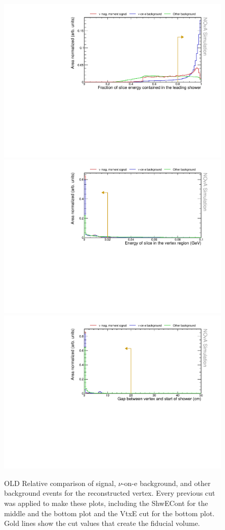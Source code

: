 \begin{figure}[hbtp]
\centering
\includegraphics[width=.9\textwidth]{Plots/NuMMEventSelection/N1Cut_showerEFracOLD.pdf}
\includegraphics[width=.9\textwidth]{Plots/NuMMEventSelection/N1Cut_vtxEOLD.pdf}
\includegraphics[width=.9\textwidth]{Plots/NuMMEventSelection/N1Cut_gapOLD.pdf}
\caption{OLD Relative comparison of signal, $\nu$-on-e background, and other background events for the reconstructed vertex. Every previous cut was applied to make these plots, including the ShwECont for the middle and the bottom plot and the VtxE cut for the bottom plot. Gold lines show the cut values that create the fiducial volume.}
\label{fig:SingleShowerCutsOld}
\end{figure}

